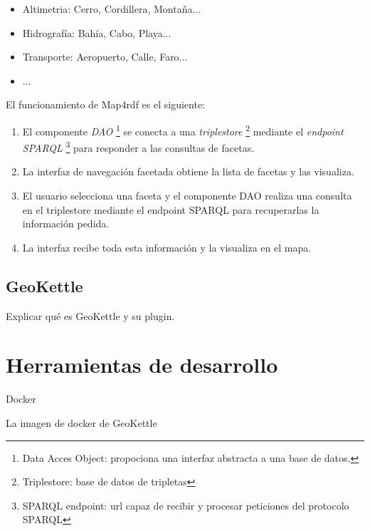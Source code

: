 \begin{itemize}
    \item Altimetria: Cerro, Cordillera, Montaña...
    \item Hidrografía: Bahía, Cabo, Playa...
    \item Transporte: Aeropuerto, Calle, Faro...
    \item ...
\end{itemize}

El funcionamiento de Map4rdf es el siguiente:
\begin{enumerate}

    \item El componente \textit{DAO} \footnote{Data Acces Object: propociona una interfaz abstracta a una base de
        datos.} se conecta a una \textit{triplestore} \footnote{Triplestore: base de datos de tripletas} mediante
        el \textit{endpoint SPARQL} \footnote{SPARQL endpoint: url capaz de recibir y procesar peticiones del
        protocolo SPARQL} para responder a las consultas de facetas. 

    \item La interfaz de navegación facetada obtiene la lista de facetas y las visualiza. 

    \item El usuario selecciona una faceta y el componente DAO realiza una consulta en el
        triplestore mediante el endpoint SPARQL para recuperarlas la información pedida.

    \item La interfaz recibe toda esta información y la visualiza en el mapa.

\end{enumerate}


\subsection{GeoKettle} Explicar qué es GeoKettle y su plugin.

\section{Herramientas de desarrollo} Docker

La imagen de docker de GeoKettle


